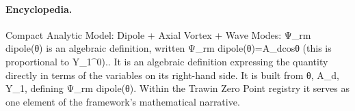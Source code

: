 \paragraph{Encyclopedia.}
Compact Analytic Model: Dipole + Axial Vortex + Wave Modes: Ψ\_rm dipole(θ) is an algebraic definition, written Ψ\_rm dipole(θ)=A\_dcosθ (this is proportional to Y\_1\textasciicircum{}0).. It is an algebraic definition expressing the quantity directly in terms of the variables on its right-hand side. It is built from θ, A\_d, Y\_1, defining Ψ\_rm dipole(θ). Within the Trawin Zero Point registry it serves as one element of the framework's mathematical narrative.
